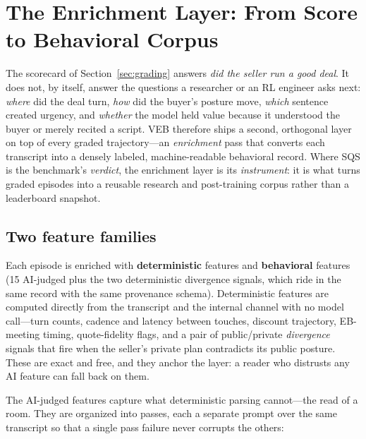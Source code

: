 \section{The Enrichment Layer: From Score to Behavioral Corpus}
\label{sec:enrichment}

The scorecard of Section~\ref{sec:grading} answers \emph{did the seller run a good
deal}. It does not, by itself, answer the questions a researcher or an RL engineer
asks next: \emph{where} did the deal turn, \emph{how} did the buyer's posture move,
\emph{which} sentence created urgency, and \emph{whether} the model held value
because it understood the buyer or merely recited a script. VEB therefore ships a
second, orthogonal layer on top of every graded trajectory---an
\emph{enrichment} pass that converts each transcript into a densely labeled,
machine-readable behavioral record. Where SQS is the benchmark's \emph{verdict},
the enrichment layer is its \emph{instrument}: it is what turns \resEnrichRows{}
graded episodes into a reusable research and post-training corpus rather than a
leaderboard snapshot.

\subsection{Two feature families}
Each episode is enriched with \numDetFeatures{} \textbf{deterministic} features and
\numAiFeatures{} \textbf{behavioral} features (15 AI-judged plus the two
deterministic divergence signals, which ride in the same record with the same
provenance schema). Deterministic features are computed
directly from the transcript and the internal channel with no model call---turn
counts, cadence and latency between touches, discount trajectory, EB-meeting
timing, quote-fidelity flags, and a pair of public/private \emph{divergence}
signals that fire when the seller's private plan contradicts its public
posture. These are exact and free, and they anchor the layer: a reader who
distrusts any AI feature can fall back on them.

The AI-judged features capture what deterministic parsing cannot---the read of a
room. They are organized into \numEnrichPasses{} passes, each a separate prompt
over the same transcript so that a single pass failure never corrupts the others:

